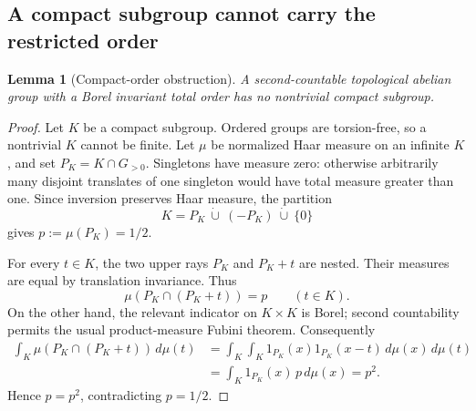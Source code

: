 \documentclass[11pt]{article}
\numberwithin{equation}{section}
\newtheorem{lemma}[lemma]{Lemma}
\theoremstyle{definition}
\theoremstyle{remark}
\begin{document}
\subsection{A compact subgroup cannot carry the restricted order}
\begin{lemma}[Compact-order obstruction]\label{pma:lc:lem:compact}
A second-countable topological abelian group with a Borel invariant total
order has no nontrivial compact subgroup.
\end{lemma}
\begin{proof}
Let $K$ be a compact subgroup. Ordered groups are torsion-free, so a
nontrivial $K$ cannot be finite. Let $\mu$ be normalized Haar measure on
an infinite $K$, and set $P_K=K\cap G_{>0}$. Singletons have measure zero:
otherwise arbitrarily many disjoint translates of one singleton would
have total measure greater than one. Since inversion preserves Haar
measure, the partition
\[
 K=P_K\ \dot\cup\ (-P_K)\ \dot\cup\ \{0\}
\]
gives $p:=\mu(P_K)=1/2$.

For every $t\in K$, the two upper rays $P_K$ and $P_K+t$ are nested.
Their measures are equal by translation invariance. Thus
\[
 \mu(P_K\cap(P_K+t))=p\qquad(t\in K).
\]
On the other hand, the relevant indicator on $K\times K$ is Borel;
second countability permits the usual product-measure Fubini theorem.
Consequently
\begin{align*}
 \int_K\mu(P_K\cap(P_K+t))\,d\mu(t)
 &=\int_K\int_K 1_{P_K}(x)1_{P_K}(x-t)\,d\mu(x)\,d\mu(t)\\
 &=\int_K1_{P_K}(x)\,p\,d\mu(x)=p^2.
\end{align*}
Hence $p=p^2$, contradicting $p=1/2$.
\end{proof}
\end{document}
